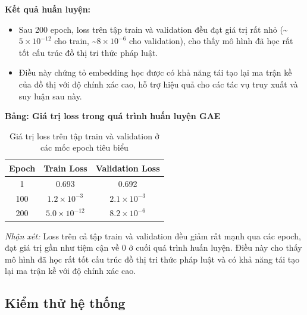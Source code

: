 \documentclass[a4paper]{article}
\begin{document}
\textbf{Kết quả huấn luyện:}
\begin{itemize}
    \item Sau 200 epoch, loss trên tập train và validation đều đạt giá trị rất nhỏ (\textasciitilde$5 \times 10^{-12}$ cho train, \textasciitilde$8 \times 10^{-6}$ cho validation), cho thấy mô hình đã học rất tốt cấu trúc đồ thị tri thức pháp luật.
    \item Điều này chứng tỏ embedding học được có khả năng tái tạo lại ma trận kề của đồ thị với độ chính xác cao, hỗ trợ hiệu quả cho các tác vụ truy xuất và suy luận sau này.
\end{itemize}



\textbf{Bảng: Giá trị loss trong quá trình huấn luyện GAE}

\begin{table}[H]
\centering
\begin{tabular}{|c|c|c|}
\hline
\textbf{Epoch} & \textbf{Train Loss} & \textbf{Validation Loss} \\
\hline
1   & 0.693 & 0.692 \\
100 & $1.2 \times 10^{-3}$ & $2.1 \times 10^{-3}$ \\
200 & $5.0 \times 10^{-12}$ & $8.2 \times 10^{-6}$ \\
\hline
\end{tabular}
\caption{Giá trị loss trên tập train và validation ở các mốc epoch tiêu biểu}
\end{table}

\textit{Nhận xét:} Loss trên cả tập train và validation đều giảm rất mạnh qua các epoch, đạt giá trị gần như tiệm cận về 0 ở cuối quá trình huấn luyện. Điều này cho thấy mô hình đã học rất tốt cấu trúc đồ thị tri thức pháp luật và có khả năng tái tạo lại ma trận kề với độ chính xác cao.

\subsection{Kiểm thử hệ thống}
\end{document}
